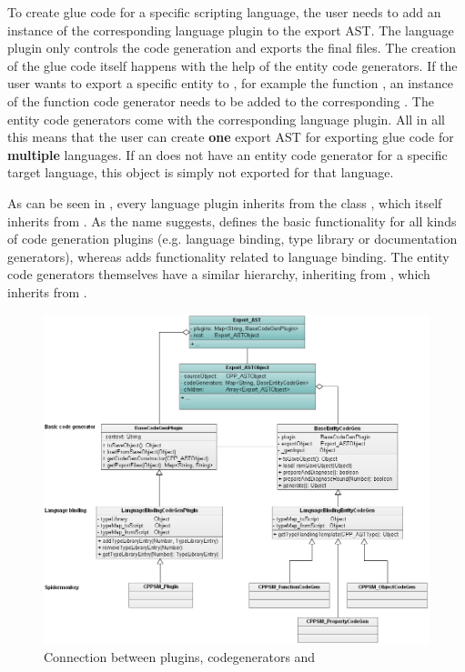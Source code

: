 To create glue code for a specific scripting language, the user needs to add an instance of the corresponding language plugin to the export AST. The language plugin only controls the code generation and exports the final files. The creation of the glue code itself happens with the help of the entity code generators. If the user wants to export a specific  entity to , for example the function , an instance of the  function code generator needs to be added to the corresponding . The entity code generators come with the corresponding language plugin. All in all this means that the user can create \textbf{one} export AST for exporting glue code for \textbf{multiple} languages. If an  does not have an entity code generator for a specific target language, this object is simply not exported for that language.

As can be seen in , every language plugin inherits from the class \linebreak{}, which itself inherits from . As the name suggests,  defines the basic functionality for all kinds of code generation plugins (e.g. language binding, type library or documentation generators), whereas  adds functionality related to language binding. The entity code generators themselves have a similar hierarchy, inheriting from \linebreak{}, which inherits from .

\begin{figure}[h!] %
	\centering
		\includegraphics[scale=0.45]{Images/UMLCodegen.png}
	\caption{Connection between plugins, codegenerators and }
	\label{fig:UMLCodeGen}
\end{figure}

